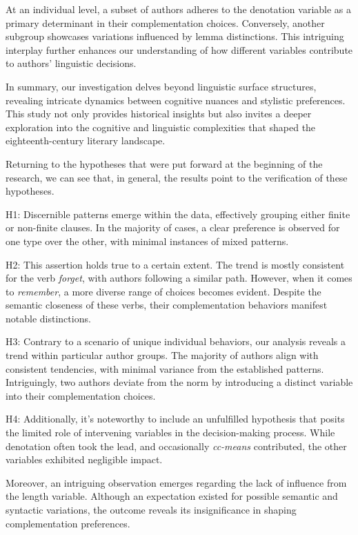 \documentclass[final]{clv3} %
\begin{document}
At an individual level, a subset of authors adheres to the denotation variable as a primary determinant in their complementation choices. Conversely, another subgroup showcases variations influenced by lemma distinctions. This intriguing interplay further enhances our understanding of how different variables contribute to authors' linguistic decisions.

In summary, our investigation delves beyond linguistic surface structures, revealing intricate dynamics between cognitive nuances and stylistic preferences. This study not only provides historical insights but also invites a deeper exploration into the cognitive and linguistic complexities that shaped the eighteenth-century literary landscape.

Returning to the hypotheses that were put forward at the beginning of the research, we can see that, in general, the results point to the verification of these hypotheses.

H1: Discernible patterns emerge within the data, effectively grouping either finite or non-finite clauses. In the majority of cases, a clear preference is observed for one type over the other, with minimal instances of mixed patterns.

H2: This assertion holds true to a certain extent. The trend is mostly consistent for the verb \textit{forget}, with authors following a similar path. However, when it comes to \textit{remember}, a more diverse range of choices becomes evident. Despite the semantic closeness of these verbs, their complementation behaviors manifest notable distinctions.

H3: Contrary to a scenario of unique individual behaviors, our analysis reveals a trend within particular author groups. The majority of authors align with consistent tendencies, with minimal variance from the established patterns. Intriguingly, two authors deviate from the norm by introducing a distinct variable into their complementation choices.

H4: Additionally, it's noteworthy to include an unfulfilled hypothesis that posits the limited role of intervening variables in the decision-making process. While denotation often took the lead, and occasionally \textit{cc-means} contributed, the other variables exhibited negligible impact.

Moreover, an intriguing observation emerges regarding the lack of influence from the length variable. Although an expectation existed for possible semantic and syntactic variations, the outcome reveals its insignificance in shaping complementation preferences.
\end{document}

